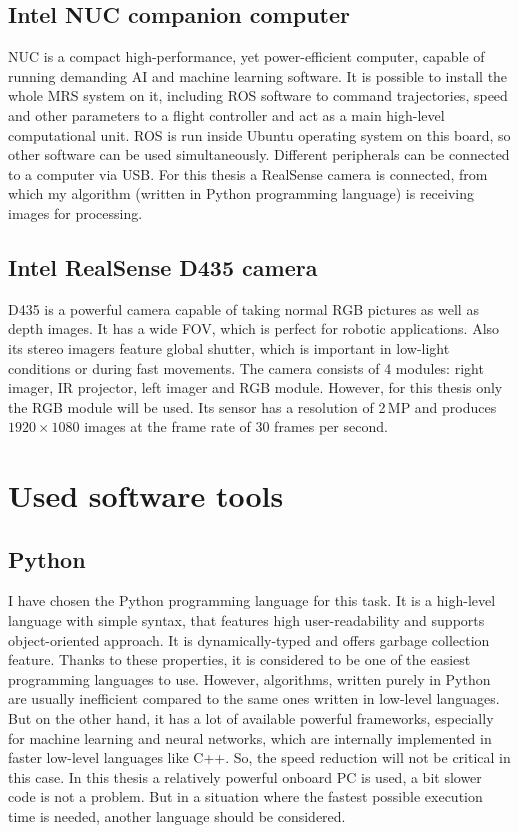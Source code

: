 \subsection{Intel NUC companion computer}

NUC is a compact high-performance, yet power-efficient computer, capable of running demanding AI and machine learning software. It is possible to install the whole \acs{MRS} system on it, including \acs{ROS} software to command trajectories, speed and other parameters to a flight controller and act as a main high-level computational unit. \acs{ROS} is run inside Ubuntu operating system on this board, so other software can be used simultaneously. Different peripherals can be connected to a computer via \acs{USB}. For this thesis a RealSense camera is connected, from which my algorithm (written in Python programming language) is receiving images for processing.

\subsection{Intel RealSense D435 camera}

D435 is a powerful camera capable of taking normal \acs{RGB} pictures as well as depth images. It has a wide \acs{FOV}, which is perfect for robotic applications. Also its stereo imagers feature global shutter, which is important in low-light conditions or during fast movements. The camera consists of 4 modules: right imager, \acs{IR} projector, left imager and \acs{RGB} module. However, for this thesis only the \acs{RGB} module will be used. Its sensor has a resolution of 2\,MP and produces $1920\times1080$ images at the frame rate of 30 frames per second.


\section{Used software tools}

\subsection{Python}

I have chosen the Python programming language for this task. It is a high-level language with simple syntax, that features high user-readability and supports object-oriented approach. It is dynamically-typed and offers garbage collection feature. Thanks to these properties, it is considered to be one of the easiest programming languages to use. However, algorithms, written purely in Python are usually inefficient compared to the same ones written in low-level languages. But on the other hand, it has a lot of available powerful frameworks, especially for machine learning and neural networks, which are internally implemented in faster low-level languages like C++. So, the speed reduction will not be critical in this case. In this thesis a relatively powerful onboard PC is used, a bit slower code is not a problem. But in a situation where the fastest possible execution time is needed, another language should be considered. 

